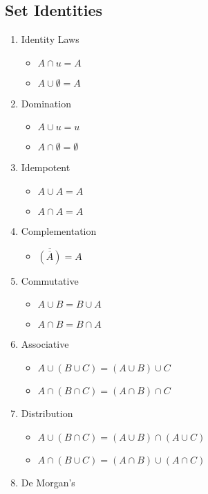 \documentclass[letterpaper, 12pt]{math}
\begin{document}
\subsection*{Set Identities}
\begin{enumerate}
  \item Identity Laws
  \begin{itemize}
    \item \( A \cap u = A \)
    \item \( A \cup \emptyset = A \)
  \end{itemize}
  \item Domination
  \begin{itemize}
    \item \( A \cup u = u \)
    \item \( A \cap \emptyset = \emptyset \)
  \end{itemize}
  \item Idempotent
  \begin{itemize}
    \item \( A \cup A = A \)
    \item \( A \cap A = A \)
  \end{itemize}
  \item Complementation
  \begin{itemize}
    \item \( \overline{(\overline{A})} = A \)
  \end{itemize}
  \item Commutative
  \begin{itemize}
    \item \( A \cup B = B \cup A \)
    \item \( A \cap B = B \cap A \)
  \end{itemize}
  \item Associative
  \begin{itemize}
    \item \( A \cup (B \cup C) = (A \cup B) \cup C \)
    \item \( A \cap (B \cap C) = (A \cap B) \cap C \)
  \end{itemize}
  \item Distribution
  \begin{itemize}
    \item \( A \cup (B \cap C) = (A \cup B) \cap (A \cup C) \)
    \item \( A \cap (B \cup C) = (A \cap B) \cup (A \cap C) \)
  \end{itemize}
  \item De Morgan's

\end{enumerate}
\end{document}
